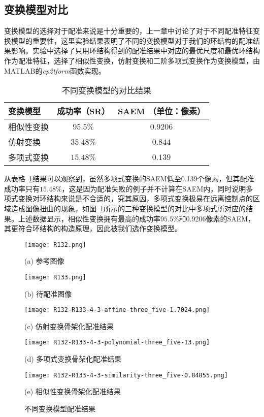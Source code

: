\subsection{变换模型对比}
变换模型的选择对于配准来说是十分重要的，上一章中讨论了对于不同配准特征变换模型的重要性，这里实验结果表明了不同的变换模型对于我们的环结构的配准结果影响。实验中选择了只用环结构得到的配准结果中对应的最优尺度和最优环结构作为配准特征，选择了相似性变换，仿射变换和二阶多项式变换作为变换模型，由MATLAB的\emph{cp2tform}函数实现。
\begin{table}[!h]
\caption{不同变换模型的对比结果}
\centering
\begin{tabular}{lcc}
\toprule
变换模型 & 成功率（SR）& SAEM （单位：像素）\\
\midrule
相似性变换 & $\mathbf{95.5\%}$ & $\mathbf{0.9206}$ \\
仿射变换 & $35.48\%$ & $0.844$              \\
多项式变换& $15.48\%$ & $0.139$\\
\bottomrule
\end{tabular}
\label{models}
\end{table}
从表格~\ref{models}结果可以观察到，虽然多项式变换的SAEM低至0.139个像素，但其配准成功率只有$15.48\%$，这是因为配准失败的例子并不计算在SAEM内，同时说明多项式变换对环结构来说是不合适的，究其原因，多项式变换极易在远离控制点的区域造成图像扭曲的现象，如图~\ref{3model}所示的三种变换模型的对比中多项式所对应的结果。上述数据显示，相似性变换拥有最高的成功率$95.5\%$和0.9206像素的SAEM，其更符合环结构的构造原理，因此被我们选作变换模型。
\begin{figure}
\centering
\begin{minipage}[b]{0.45\linewidth} 
      \centering 
      \texttt{[image: R132.png]}
        \centerline{(a) 参考图像}\medskip
\end{minipage}
  \begin{minipage}[b]{0.45\linewidth}
    \centering
    \texttt{[image: R133.png]}
      \centerline{(b) 待配准图像}\medskip
  \end{minipage}
    \begin{minipage}[b]{0.45\linewidth}
    \centering
    \texttt{[image: R132-R133-4-3-affine-three\_five-1.7024.png]}
      \centerline{(c) 仿射变换骨架化配准结果}\medskip
  \end{minipage}
  \begin{minipage}[b]{0.45\linewidth}
    \centering
    \texttt{[image: R132-R133-4-3-polynomial-three\_five-13.png]}
      \centerline{(d) 多项式变换骨架化配准结果}\medskip
  \end{minipage}
   \begin{minipage}[b]{0.45\linewidth}
    \centering
    \texttt{[image: R132-R133-4-3-similarity-three\_five-0.84855.png]}
      \centerline{(e) 相似性变换骨架化配准结果}\medskip
  \end{minipage}
 \caption{不同变换模型配准结果}
\label{3model}
\end{figure}


